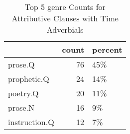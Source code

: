 \begin{table}[htbp!]
\centering
\caption{Top 5 genre Counts for Attributive Clauses with Time Adverbials}
\label{table:submod_genre}
\begin{tabular}{lrl}
\toprule
{} &  count & percent \\
\midrule
prose.Q       &     76 &     45\% \\
prophetic.Q   &     24 &     14\% \\
poetry.Q      &     20 &     11\% \\
prose.N       &     16 &      9\% \\
instruction.Q &     12 &      7\% \\
\bottomrule
\end{tabular}
\end{table}
